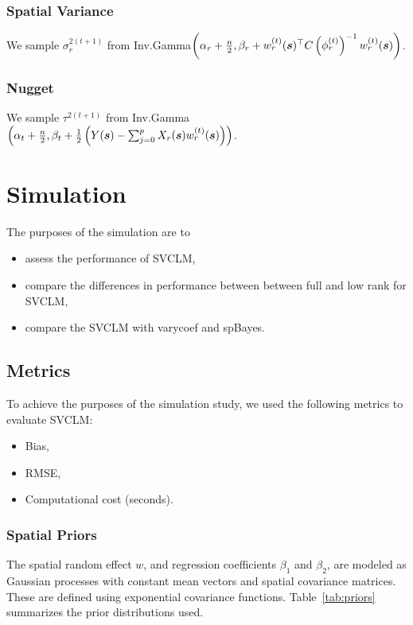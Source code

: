\subsubsection{Spatial Variance}
\label{sec:spatial_variance}

We sample $\sigma_r^{2(t+1)}$ from Inv.Gamma$\left(\alpha_r + \frac{n}{2}, \beta_r + w_r^{(t)}(\boldsymbol{s})^{\top} C\left(\phi_r^{(t)}\right)^{-1} w_r^{(t)}(\boldsymbol{s})\right)$.

\subsubsection{Nugget}
\label{sec:nugget}

We sample $\tau^{2(t+1)}$ from Inv.Gamma$\left(\alpha_t + \frac{n}{2}, \beta_t + \frac{1}{2} \left(Y(\boldsymbol{s}) - \sum_{j=0}^p X_r(\boldsymbol{s})w_r^{(t)}(\boldsymbol{s}) \right)\right)$.

\section{Simulation}
\label{sec:simulation}
The purposes of the simulation are to 
\begin{itemize}
    \item assess the performance of SVCLM,
    \item compare the differences in performance between between full and low rank for SVCLM,
    \item compare the SVCLM with varycoef and spBayes.
\end{itemize}

\subsection{Metrics}
To achieve the purposes of the simulation study, we used the following metrics to evaluate SVCLM:
\begin{itemize}
    \item Bias,
    \item RMSE,
    \item Computational cost (seconds).
\end{itemize}

\subsubsection{Spatial Priors}

The spatial random effect \( w \), and regression coefficients \( \beta_1 \) and \( \beta_2 \), are modeled as Gaussian processes with constant mean vectors and spatial covariance matrices. These are defined using exponential covariance functions. Table~\ref{tab:priors} summarizes the prior distributions used.

